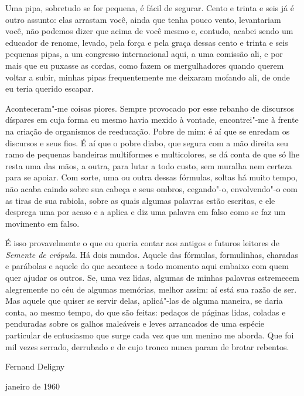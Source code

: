 Uma pipa, sobretudo se for pequena, é fácil de segurar. Cento e trinta e
seis já é outro assunto: elas arrastam você, ainda que tenha pouco
vento, levantariam você, não podemos dizer que acima de você mesmo e,
contudo, acabei sendo um educador de renome, levado, pela força e pela
graça dessas cento e trinta e seis pequenas pipas, a um congresso
internacional aqui, a uma comissão ali, e por mais que eu puxasse as
cordas, como fazem os mergulhadores quando querem voltar a subir, minhas
pipas frequentemente me deixaram mofando ali, de onde eu teria querido
escapar.

Aconteceram"-me coisas piores. Sempre provocado por esse rebanho de
discursos díspares em cuja forma eu mesmo havia mexido à vontade,
encontrei"-me à frente na criação de organismos de reeducação. Pobre de
mim: é aí que se enredam os discursos e seus fios. É aí que o pobre
diabo, que segura com a mão direita seu ramo de pequenas bandeiras
multiformes e multicolores, se dá conta de que só lhe resta uma das mãos,
a outra, para lutar a todo custo, sem muralha nem certeza para se
apoiar. Com sorte, uma ou outra dessas fórmulas, soltas há muito tempo,
não acaba caindo sobre sua cabeça e seus ombros, cegando"-o, envolvendo"-o
com as tiras de sua rabiola, sobre as quais algumas palavras estão
escritas, e ele desprega uma por acaso e a aplica e diz uma palavra em
falso como se faz um movimento em falso.

É isso provavelmente o que eu queria contar aos antigos e futuros
leitores de \emph{Semente de crápula}. Há dois mundos. Aquele das
fórmulas, formulinhas, charadas e parábolas e aquele do que acontece a
todo momento aqui embaixo com quem quer ajudar os outros. Se, uma vez
lidas, algumas de minhas palavras estremecem alegremente no céu de
algumas memórias, melhor assim: aí está sua razão de ser. Mas aquele que
quiser se servir delas, aplicá"-las de alguma maneira, se daria conta, ao
mesmo tempo, do que são feitas: pedaços de páginas lidas, coladas e
penduradas sobre os galhos maleáveis e leves arrancados de uma espécie
particular de entusiasmo que surge cada vez que um menino me aborda. Que
foi mil vezes serrado, derrubado e de cujo tronco nunca param de brotar
rebentos.

\hfill{}Fernand Deligny

\hfill{}janeiro de 1960

\pagebreak